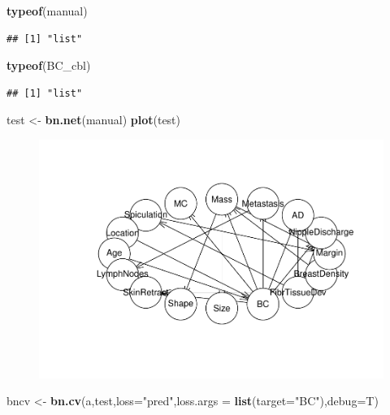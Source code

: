 \documentclass[]{article}
\newenvironment{Shaded}{\begin{snugshade}}{\end{snugshade}}
\newcommand{\KeywordTok}[1]{\textcolor[rgb]{0.13,0.29,0.53}{\textbf{{#1}}}}
\newcommand{\DataTypeTok}[1]{\textcolor[rgb]{0.13,0.29,0.53}{{#1}}}
\newcommand{\StringTok}[1]{\textcolor[rgb]{0.31,0.60,0.02}{{#1}}}
\newcommand{\NormalTok}[1]{{#1}}
\begin{document}
\begin{Shaded}
\begin{Highlighting}[]
\KeywordTok{typeof}\NormalTok{(manual)}
\end{Highlighting}
\end{Shaded}

\begin{verbatim}
## [1] "list"
\end{verbatim}

\begin{Shaded}
\begin{Highlighting}[]
\KeywordTok{typeof}\NormalTok{(BC_cbl)}
\end{Highlighting}
\end{Shaded}

\begin{verbatim}
## [1] "list"
\end{verbatim}

\begin{Shaded}
\begin{Highlighting}[]
\NormalTok{test <-}\StringTok{ }\KeywordTok{bn.net}\NormalTok{(manual)}
\KeywordTok{plot}\NormalTok{(test)}
\end{Highlighting}
\end{Shaded}

\begin{figure}[htbp]
\centering
\includegraphics{BN_Ass2_files/figure-latex/unnamed-chunk-9-1.pdf}
\end{figure}

\begin{Shaded}
\begin{Highlighting}[]
\NormalTok{bncv <-}\StringTok{ }\KeywordTok{bn.cv}\NormalTok{(a,test,}\DataTypeTok{loss=}\StringTok{"pred"}\NormalTok{,}\DataTypeTok{loss.args =} \KeywordTok{list}\NormalTok{(}\DataTypeTok{target=}\StringTok{"BC"}\NormalTok{),}\DataTypeTok{debug=}\NormalTok{T)}
\end{Highlighting}
\end{Shaded}
\end{document}
